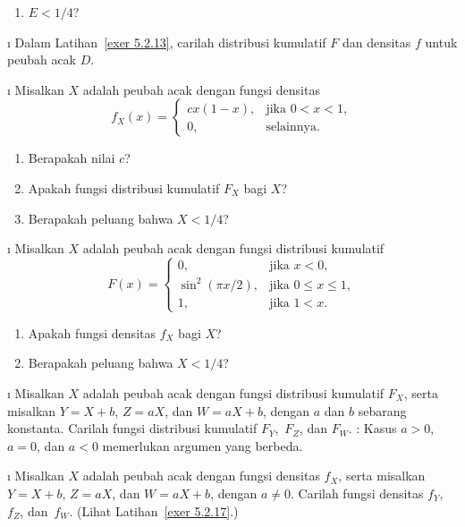 \begin{LJSItem}
\begin{enumerate}
\item $E < 1/4$?
\end{enumerate}

\i\label{exer 5.2.14} Dalam Latihan~\ref{exer 5.2.13}, carilah distribusi kumulatif
$F$ dan densitas $f$ untuk peubah acak $D$.

\i\label{5.2.15} Misalkan $X$ adalah peubah acak dengan fungsi densitas
$$ f_X(x) = \left \{ \begin{array}{ll}
                cx(1 - x), & \mbox{jika $0 < x < 1$}, \\
                        0, & \mbox{selainnya.}
                  \end{array}
         \right.
$$
\begin{enumerate}
\item Berapakah nilai $c$?

\item Apakah fungsi distribusi kumulatif $F_X$ bagi $X$?

\item Berapakah peluang bahwa $X < 1/4$?
\end{enumerate}

\i\label{5.2.16} Misalkan $X$ adalah peubah acak dengan fungsi distribusi kumulatif
$$ F(x) =  \left \{ \begin{array}{ll}
                            0, & \mbox{jika $x < 0$}, \\
              \sin^2(\pi x/2), & \mbox{jika $0 \leq x \leq 1$},  \\
                            1, & \mbox{jika $1 < x$}.
                 \end{array}
        \right.
$$
\begin{enumerate}
\item Apakah fungsi densitas $f_X$ bagi $X$?

\item Berapakah peluang bahwa $X < 1/4$?
\end{enumerate}

\i\label{exer 5.2.17} Misalkan $X$ adalah peubah acak dengan fungsi distribusi
kumulatif $F_X$, serta misalkan $Y = X + b$, $Z = aX$, dan $W = aX + b$, dengan $a$
dan $b$ sebarang konstanta.  Carilah fungsi distribusi kumulatif $F_Y$,~$F_Z$, dan
$F_W$.   : Kasus $a > 0$, $a = 0$, dan $a < 0$ memerlukan argumen yang
berbeda.

\i\label{exer 5.2.18} Misalkan $X$ adalah peubah acak dengan fungsi densitas $f_X$,
serta misalkan $Y = X + b$, $Z = aX$, dan $W = aX + b$, dengan $a \ne 0$.  Carilah
fungsi densitas $f_Y$,~$f_Z$, dan~$f_W$.  (Lihat Latihan~\ref{exer 5.2.17}.)


\end{LJSItem}
